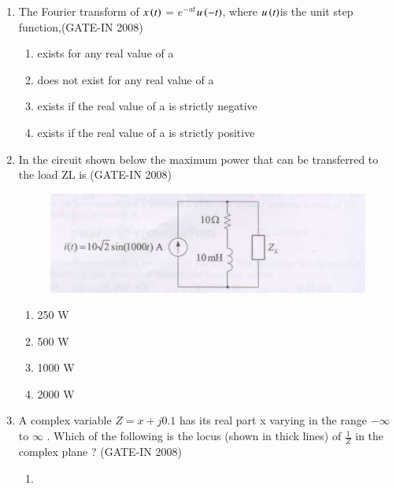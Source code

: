 \documentclass[journal,12pt,onecolumn]{IEEEtran}
\theoremstyle{remark}
\begin{document}
\begin{enumerate}
    \item The Fourier transform of $x\left(t\right)$ = $e^{-at}$$u\left(-t\right)$, where $u\left(t\right)$is the unit step function,\hfill{(GATE-IN 2008)}
    \begin{multicols}{2}
    \begin{enumerate} 
        \item exists for any real value of a
        \item does not exist for any real value of a
        \item exists if the real value of a is strictly negative
        \item exists if the real value of a is strictly positive
    \end{enumerate}
    \end{multicols}
    
    \item In the circuit shown below  the maximum power that can be transferred to the load ZL is \hfill{(GATE-IN 2008)}

        \begin{figure}[H]
    \centering
    \includegraphics[width=0.5\columnwidth]{figs/i7.jpg}
    \caption{}
    \label{fig:placeholder7}
\end{figure}
\begin{multicols}{4}
    \begin{enumerate} 
        \item 250 W
        \item 500 W
        \item 1000 W
        \item 2000 W
    \end{enumerate}
    \end{multicols}
    
    \item A complex variable $Z=x + j0.1$ has its real part x varying in the range $-\infty$ to $\infty$ . Which of the following is the locus (shown in thick lines) of \(\frac{1}{Z}\) in the complex plane ? \hfill{(GATE-IN 2008)}
    \begin{multicols}{2}
    \begin{enumerate} 
        \item  
        

\end{enumerate}
\end{multicols}
\end{enumerate}
\end{document}
